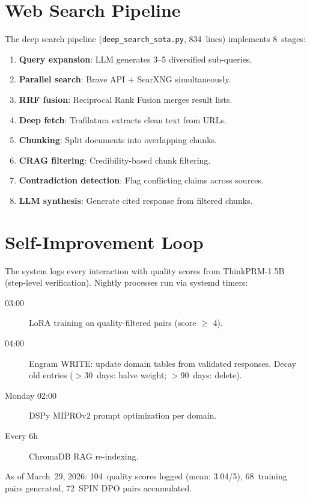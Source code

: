 \documentclass[10pt,a4paper]{article}
\begin{document}
\section{Web Search Pipeline}

The deep search pipeline (\texttt{deep\_search\_sota.py}, 834~lines) implements 8~stages:

\begin{enumerate}
  \item \textbf{Query expansion}: LLM generates 3--5 diversified sub-queries.
  \item \textbf{Parallel search}: Brave API + SearXNG simultaneously.
  \item \textbf{RRF fusion}: Reciprocal Rank Fusion merges result lists.
  \item \textbf{Deep fetch}: Trafilatura extracts clean text from URLs.
  \item \textbf{Chunking}: Split documents into overlapping chunks.
  \item \textbf{CRAG filtering}: Credibility-based chunk filtering.
  \item \textbf{Contradiction detection}: Flag conflicting claims across sources.
  \item \textbf{LLM synthesis}: Generate cited response from filtered chunks.
\end{enumerate}

\section{Self-Improvement Loop}

The system logs every interaction with quality scores from ThinkPRM-1.5B (step-level verification). Nightly processes run via systemd timers:

\begin{description}
  \item[03:00] LoRA training on quality-filtered pairs (score $\geq$ 4).
  \item[04:00] Engram WRITE: update domain tables from validated responses. Decay old entries ($>$30~days: halve weight; $>$90~days: delete).
  \item[Monday 02:00] DSPy MIPROv2 prompt optimization per domain.
  \item[Every 6h] ChromaDB RAG re-indexing.
\end{description}

As of March~29, 2026: 104~quality scores logged (mean: 3.04/5), 68~training pairs generated, 72~SPIN DPO pairs accumulated.
\end{document}
